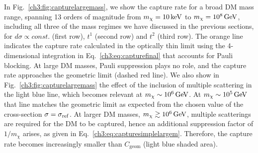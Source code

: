 In Fig.~\ref{ch3:fig:capturelargemass}, we show the capture rate for a broad DM mass range, spanning 13 orders of magnitude from $m_\chi=10{\rm \,keV}$ to $m_\chi=10^8{\rm \,GeV}$, including all three of the mass regimes we have discussed in the previous sections, for $d\sigma\propto const.$ (first row), $t^1$ (second row) and $t^2$ (third row).
The orange line indicates the capture rate calculated in the optically thin limit using the 4-dimensional integration in Eq.~\ref{ch3:eq:capturefinal} that accounts for Pauli blocking. 
At large DM masses, Pauli suppression plays no role, and the capture rate approaches the geometric limit (dashed red line). 
We also show in Fig.~\ref{ch3:fig:capturelargemass} the effect of the inclusion of multiple scattering in the light blue line, which becomes relevant at $m_\chi\sim10^6{\rm \,GeV}$. 
At $m_\chi\sim 10^5{\rm \,GeV}$ that line matches the geometric limit as expected from the chosen value of the cross-section $\sigma=\sigma_\mathrm{ref}$. At larger DM masses, $m_\chi\gtrsim10^6{\rm \,GeV}$, multiple scatterings are required for the DM to be captured, hence an additional suppression factor of $1/m_\chi$ arises, as given in Eq.~\ref{ch3:eq:capturesimplelargem}. Therefore, the capture rate becomes increasingly smaller than $C_\mathrm{geom}$ (light blue shaded area). 

